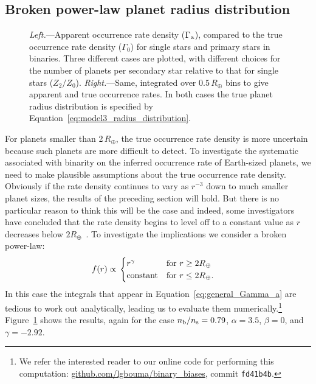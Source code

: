 \documentclass[12pt,modern,trackchanges]{aastex61}
\renewcommand{\a}{_{\rm a}}
\newcommand{\s}{_{\rm s}}
\renewcommand{\b}{_{\rm b}}
\begin{document}
\subsection{Broken power-law planet radius distribution}
\label{sec:model_3}

\begin{figure}[!t]
    \centering
    \caption{ {\it Left.}---Apparent occurrence rate density
      ($\Gamma\a$), compared to the true occurrence rate density
      ($\Gamma_0$) for single stars and primary stars in binaries.
      Three different cases are plotted, with different choices for
      the number of planets per secondary star relative to
      that for single stars ($Z_2/Z_0$).
      {\it Right.}---Same, integrated over $0.5\,R_\oplus$
      bins to give apparent and true occurrence rates.
      In both cases the true planet
      radius distribution is specified by
      Equation~\ref{eq:model3_radius_distribution}.
    }
    \label{fig:occ_rate_model_3_log}
\end{figure}

For planets smaller than 2\,$R_\oplus$, the true occurrence rate
density is more uncertain because such planets are more difficult to
detect.  To investigate the systematic  
associated with binarity
on the inferred occurrence rate of Earth-sized planets, we need to
make plausible assumptions about the true occurrence rate density.
Obviously if the rate density continues to vary as $r^{-3}$ down to
much smaller planet sizes, the results of the preceding section will
hold.  But there is no particular reason to think this will be the
case and indeed, some investigators have concluded that the rate
density begins to level off to a constant value as $r$ decreases below
$2R_\oplus$~\citep{petigura_plateau_2013}.  To investigate the
implications we consider a broken power-law:
\begin{align}
    f(r)
    &\propto
    \left.
    \begin{cases}
        r^\gamma & \text{for } r\geq 2R_\oplus \\
        {\rm constant} & \text{for } r\leq2R_\oplus.
    \end{cases}
    \right.
    \label{eq:model3_radius_distribution}
\end{align}
In this case the integrals that appear in
Equation~\ref{eq:general_Gamma_a} are tedious to work out
analytically, leading us to evaluate them numerically.\footnote{We
refer the interested reader to our online code for performing this
computation: \url{github.com/lgbouma/binary_biases}, commit
\texttt{fd41b4b}.} Figure~\ref{fig:occ_rate_model_3_log} shows the
results, again for the case $n\b/n\s=0.79$, $\alpha = 3.5$, $\beta=0$,
and $\gamma=-2.92$.
\end{document}
